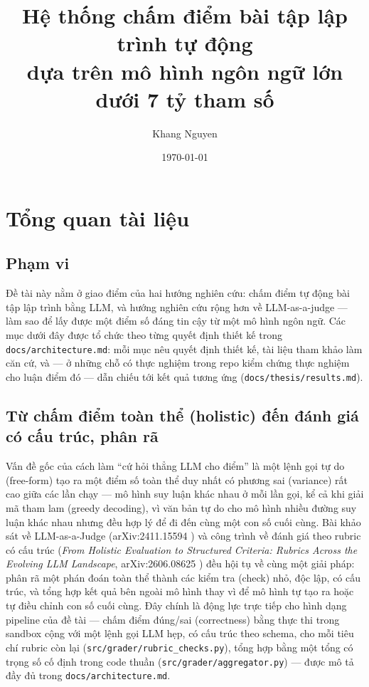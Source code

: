 \documentclass[a4paper,12pt]{report}
\title{Hệ thống chấm điểm bài tập lập trình tự động\\ dựa trên mô hình ngôn ngữ lớn dưới 7 tỷ tham số}
\author{Khang Nguyen}
\date{\today}
\begin{document}
\maketitle
\tableofcontents

\chapter{Tổng quan tài liệu}
\label{ch:lit-review}

\section{Phạm vi}

Đề tài này nằm ở giao điểm của hai hướng nghiên cứu: chấm điểm tự động bài
tập lập trình bằng LLM, và hướng nghiên cứu rộng hơn về LLM-as-a-judge —
làm sao để lấy được một điểm số đáng tin cậy từ một mô hình ngôn ngữ. Các
mục dưới đây được tổ chức theo từng quyết định thiết kế trong
\texttt{docs/architecture.md}: mỗi mục nêu quyết định thiết kế, tài liệu
tham khảo làm căn cứ, và — ở những chỗ có thực nghiệm trong repo kiểm chứng
thực nghiệm cho luận điểm đó — dẫn chiếu tới kết quả tương ứng
(\texttt{docs/thesis/results.md}).

\section{Từ chấm điểm toàn thể (holistic) đến đánh giá có cấu trúc, phân rã}
\label{sec:rubric-decomposition-lit}

Vấn đề gốc của cách làm ``cứ hỏi thẳng LLM cho điểm'' là một lệnh gọi tự do
(free-form) tạo ra một điểm số toàn thể duy nhất có phương sai (variance)
rất cao giữa các lần chạy — mô hình suy luận khác nhau ở mỗi lần gọi, kể cả
khi giải mã tham lam (greedy decoding), vì văn bản tự do cho mô hình nhiều
đường suy luận khác nhau nhưng đều hợp lý để đi đến cùng một con số cuối
cùng. Bài khảo sát về LLM-as-a-Judge (arXiv:2411.15594
\cite{survey_llm_judge}) và công trình về đánh giá theo rubric có cấu trúc
(\textit{From Holistic Evaluation to Structured Criteria: Rubrics Across
the Evolving LLM Landscape}, arXiv:2606.08625
\cite{rubric_decomposition}) đều hội tụ về cùng một giải pháp: phân rã một
phán đoán toàn thể thành các kiểm tra (check) nhỏ, độc lập, có cấu trúc, và
tổng hợp kết quả bên ngoài mô hình thay vì để mô hình tự tạo ra hoặc tự
điều chỉnh con số cuối cùng. Đây chính là động lực trực tiếp cho hình dạng
pipeline của đề tài — chấm điểm đúng/sai (correctness) bằng thực thi trong
sandbox cộng với một lệnh gọi LLM hẹp, có cấu trúc theo schema, cho mỗi
tiêu chí rubric còn lại (\texttt{src/grader/rubric\_checks.py}), tổng hợp
bằng một tổng có trọng số cố định trong code thuần
(\texttt{src/grader/aggregator.py}) — được mô tả đầy đủ trong
\texttt{docs/architecture.md}.
\end{document}
